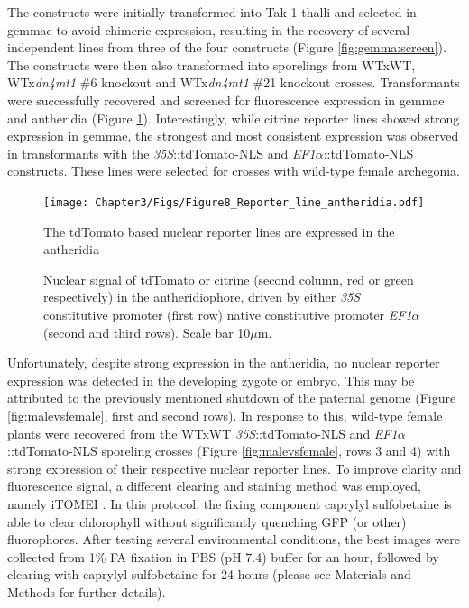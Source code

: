 The constructs were initially transformed into Tak-1 thalli and selected in gemmae to avoid chimeric expression, resulting in the recovery of several independent lines from three of the four constructs (Figure \ref{fig:gemma:screen}). The constructs were then also transformed into sporelings from WTxWT, WTx\textit{dn4mt1} \#6 knockout and WTx\textit{dn4mt1} \#21 knockout crosses. Transformants were successfully recovered and screened for fluorescence expression in gemmae and antheridia (Figure \ref{fig:antheridia_screen}). Interestingly, while citrine reporter lines showed strong expression in gemmae, the strongest and most consistent expression was observed in transformants with the \textit{35S}::tdTomato-NLS and \textit{EF1$\alpha$}::tdTomato-NLS constructs. These lines were selected for crosses with wild-type female archegonia.

\begin{figure}[htbp!] 
\centering    
    \texttt{[image: Chapter3/Figs/Figure8\_Reporter\_line\_antheridia.pdf]}
\caption{The tdTomato based nuclear reporter lines are expressed in the antheridia}
\label{fig:antheridia_screen}
\captionsetup{font=small}
    \caption*{Nuclear signal of tdTomato or citrine (second column, red or green respectively) in the antheridiophore, driven by either \textit{35S} constitutive promoter (first row) native constitutive promoter \textit{EF1$\alpha$} (second and third rows). Scale bar 10$\mu$m.}
\end{figure}

Unfortunately, despite strong expression in the antheridia, no nuclear reporter expression was detected in the developing zygote or embryo. This may be attributed to the previously mentioned shutdown of the paternal genome (Figure \ref{fig:malevsfemale}, first and second rows).  In response to this, wild-type female plants were recovered from the WTxWT \textit{35S}::tdTomato-NLS and  \textit{EF1$\alpha$}::tdTomato-NLS sporeling crosses (Figure \ref{fig:malevsfemale}, rows 3 and 4) with strong expression of their respective nuclear reporter lines. To improve clarity and fluorescence signal, a different clearing and staining method was employed, namely iTOMEI \cite{RN279}. In this protocol, the fixing component caprylyl sulfobetaine is able to clear chlorophyll without significantly quenching GFP (or other) fluorophores. After testing several environmental conditions, the best images were collected from 1\% FA fixation in PBS (pH 7.4) buffer for an hour, followed by clearing with caprylyl sulfobetaine for 24 hours (please see Materials and Methods for further details).

